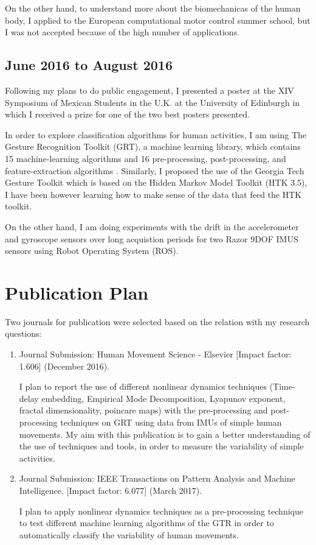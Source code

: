 \documentclass[9pt,journal,onecolumn,compsoc]{IEEEtran}
\begin{document}
On the other hand, to understand more about the biomechanicas of the human body,
I applied to the European computational motor control summer school, but
I was not accepted because of the high number of applications.

\subsection{June 2016 to August 2016}

Following my plans to do public engagement, I presented a poster at the XIV Symposium of Mexican Students in the U.K. 
at the University of Edinburgh in which I received a prize for one of the two best posters presented.

In order to explore classification algorithms for human activities,
I am using The Gesture Recognition Toolkit (GRT), a machine learning library,
which contains 15 machine-learning algorithms and 16 pre-processing, post-processing, and feature-extraction algorithms 
\cite{Gillian2014}. Similarly, I proposed the use of the Georgia Tech Gesture Toolkit \cite{Westeyn2003}
which is based on the Hidden Markov Model Toolkit (HTK 3.5), I have been however learning 
how to make sense of the data that feed the HTK toolkit.

On the other hand, I am doing experiments with the drift in the accelerometer and gyroscope sensors 
over long acquistion periods for two Razor 9DOF IMUS sensors using Robot Operating System (ROS).

\section{Publication Plan}

Two journals for publication 
were selected based on the relation with my research questions:


\begin{enumerate}
 \item Journal Submission: Human Movement Science - Elsevier [Impact factor: 1.606] (December 2016).
 
I plan to report the use of different nonlinear dynamics techniques 
(Time-delay embedding, Empirical Mode Decomposition, Lyapunov exponent, fractal dimensionality, poincare maps)
with the pre-processing and post-processing techniques on GRT using data from IMUs of simple human movements.
My aim with this publication is to gain a better understanding of the use of techniques and tools,
in order to measure the variability of simple activities.

\item Journal Submission: IEEE Transactions on Pattern Analysis and Machine Intelligence.
[Impact factor: 6.077] (March 2017).

I plan to apply nonlinear dynamics techniques as a pre-processing technique 
to test different machine learning algorithms of the GTR in order 
to automatically classify the variability of human movements. 

\end{enumerate}
\end{document}
